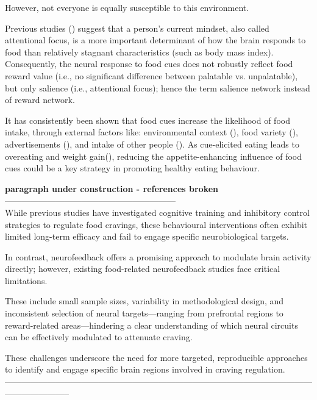 \documentclass[]{imag-ms-template}
\begin{document}
However, not everyone is equally susceptible to this environment. 

Previous studies (\cite{frankortRewardActivitySatiated2012, franssenPowerMindAttentional2020, franssenEffectsMindsetHormonal2022, pimpiniMoreComplexYou2022, kochsItMatterPerspective2023}) suggest that a person’s current mindset, also called attentional focus, is a more important determinant of how the brain responds to food than relatively stagnant characteristics (such as body mass index). Consequently, the neural response to food cues does not robustly reflect food reward value (i.e., no significant difference between palatable vs. unpalatable), but only salience (i.e., attentional focus); hence the term salience network instead of reward network.

It has consistently been shown that food cues increase the likelihood of food intake, through external factors like: environmental context (\cite{jansenCuedOvereating2011b}), food variety (\cite{guerrieriInteractionImpulsivityVaried2008, remickInternalExternalModerators2009}), advertisements (\cite{harrisPrimingEffectsTelevision2009}), and intake of other people (\cite{hermansMimicryFoodIntake2012}). As cue-elicited eating leads to overeating and weight gain(\cite{jansenCuedOvereating2011b, frankortCravingStopsYou2014}), reducing the appetite-enhancing influence of food cues could be a key strategy in promoting healthy eating behaviour.


\textbf{paragraph under construction - references broken} ------------------------------------------------------------
\\
While previous studies have investigated cognitive training and inhibitory control strategies to regulate food cravings, these behavioural interventions often exhibit limited long-term efficacy and fail to engage specific neurobiological targets.\cite{pasquale}

In contrast, neurofeedback offers a promising approach to modulate brain activity directly; however, existing food-related neurofeedback studies face critical limitations. \cite{Ihssen, Bartholdy, Kohl, Schmidt&Martin, Blume, Leong, de Clerck, Pasquale}

These include small sample sizes, variability in methodological design, and inconsistent selection of neural targets—ranging from prefrontal regions to reward-related areas—hindering a clear understanding of which neural circuits can be effectively modulated to attenuate craving.

These challenges underscore the need for more targeted, reproducible approaches to identify and engage specific brain regions involved in craving regulation.
\\
-----------------------------------------------------------------------------------------------------------------------------------
\end{document}
